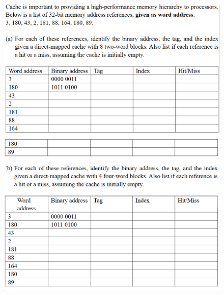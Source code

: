 \documentclass[cn,12pt]{homework}
\begin{document}

\begin{problem}
  \quad
  \begin{figure}[H]
    \centering
    \includegraphics[width=1\textwidth]{./figures/image3.png}
    \label{fig:pro1}
  \end{figure}

\end{problem}
\end{document}
